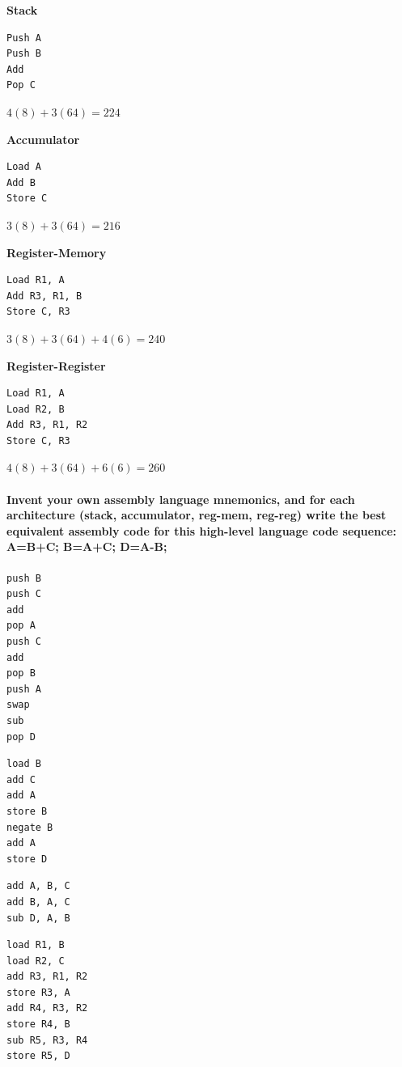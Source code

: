 \documentclass{article}
\begin{document}
\textbf{Stack} 

\begin{verbatim}
Push A
Push B
Add
Pop C
\end{verbatim}

$4(8) + 3(64) = 224 $

\textbf{Accumulator}
\begin{verbatim}
Load A
Add B
Store C
\end{verbatim}

$3(8) + 3(64) = 216$

\textbf{Register-Memory}
\begin{verbatim}
Load R1, A
Add R3, R1, B
Store C, R3
\end{verbatim}

$3(8) + 3(64) + 4(6) = 240$

\textbf{Register-Register}
\begin{verbatim}
Load R1, A
Load R2, B
Add R3, R1, R2
Store C, R3
\end{verbatim}

$4(8) + 3(64) + 6(6) = 260$


\paragraph{Invent your own assembly language mnemonics, and for each architecture (stack, accumulator, reg-mem, reg-reg) write the best
equivalent assembly code for this high-level language code sequence: A=B+C; B=A+C; D=A-B;}

\begin{verbatim}
push B 
push C
add
pop A
push C
add
pop B
push A
swap 
sub
pop D
\end{verbatim}

\begin{verbatim}
load B
add C
add A
store B
negate B
add A
store D
\end{verbatim}

\begin{verbatim}
add A, B, C
add B, A, C
sub D, A, B
\end{verbatim}

\begin{verbatim}
load R1, B
load R2, C
add R3, R1, R2
store R3, A
add R4, R3, R2
store R4, B
sub R5, R3, R4
store R5, D

\end{verbatim}
\end{document}
